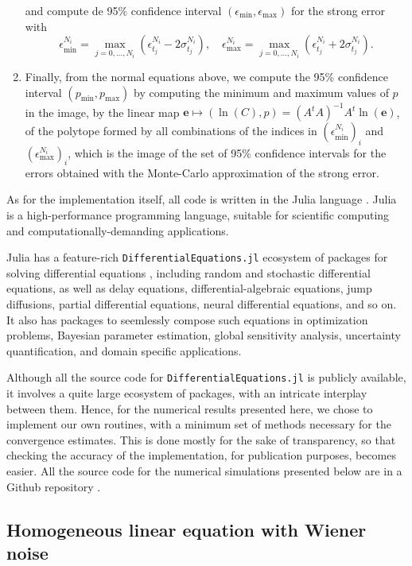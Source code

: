 \documentclass[reqno,12pt]{amsart}
\theoremstyle{plain} %
\theoremstyle{definition} %
\begin{document}
\begin{enumerate}
\[    \]
    and compute de 95\% confidence interval $(\epsilon_{\min}, \epsilon_{\max})$ for the strong error with
    \[
        \epsilon_{\min}^{N_i} = \max_{j=0, \ldots, N_i} (\epsilon_{t_j}^{N_i} - 2\sigma_{t_j}^{N_i}), \quad \epsilon_{\max}^{N_i} = \max_{j=0, \ldots, N_i} (\epsilon_{t_j}^{N_i} + 2\sigma_{t_j}^{N_i}).
    \]
    \item Finally, from the normal equations above, we compute the 95\% confidence interval $(p_{\min}, p_{\max})$ by computing the minimum and maximum values of $p$ in the image, by the linear map $\mathbf{e} \mapsto (\ln(C), p) = (A^tA)^{-1}A^t\ln(\mathbf{e})$, of the polytope formed by all combinations of the indices in $(\epsilon_{\min}^{N_i})_i$ and $(\epsilon_{\max}^{N_i})_i$, which is the image of the set of 95\% confidence intervals for the errors obtained with the Monte-Carlo approximation of the strong error.
\end{enumerate}

As for the implementation itself, all code is written in the Julia language \cite{Julia2017}. Julia is a high-performance programming language, suitable for scientific computing and computationally-demanding applications.

Julia has a feature-rich \texttt{DifferentialEquations.jl} ecosystem of packages for solving differential equations \cite{RackauckasNie2017}, including random and stochastic differential equations, as well as delay equations, differential-algebraic equations, jump diffusions, partial differential equations, neural differential equations, and so on. It also has packages to seemlessly compose such equations in optimization problems, Bayesian parameter estimation, global sensitivity analysis, uncertainty quantification, and domain specific applications.

Although all the source code for \texttt{DifferentialEquations.jl} is publicly available, it involves a quite large ecosystem of packages, with an intricate interplay between them. Hence, for the numerical results presented here, we chose to implement our own routines, with a minimum set of methods necessary for the convergence estimates. This is done mostly for the sake of transparency, so that checking the accuracy of the implementation, for publication purposes, becomes easier. All the source code for the numerical simulations presented below are in a Github repository \cite{RODEConvEM2023}.

\subsection{Homogeneous linear equation with Wiener noise}
\label{seclinearhomogeneousrode}
\end{document}
